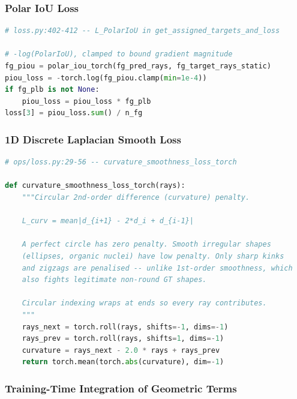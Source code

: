\subsubsection{Polar IoU Loss}

\begin{lstlisting}[language=Python]
# loss.py:402-412 -- L_PolarIoU in get_assigned_targets_and_loss

# -log(PolarIoU), clamped to bound gradient magnitude
fg_piou = polar_iou_torch(fg_pred_rays, fg_target_rays_static)
piou_loss = -torch.log(fg_piou.clamp(min=1e-4))
if fg_plb is not None:
    piou_loss = piou_loss * fg_plb
loss[3] = piou_loss.sum() / n_fg
\end{lstlisting}

\subsubsection{1D Discrete Laplacian Smooth Loss}

\begin{lstlisting}[language=Python]
# ops/loss.py:29-56 -- curvature_smoothness_loss_torch

def curvature_smoothness_loss_torch(rays):
    """Circular 2nd-order difference (curvature) penalty.

    L_curv = mean|d_{i+1} - 2*d_i + d_{i-1}|

    A perfect circle has zero penalty. Smooth irregular shapes
    (ellipses, organic nuclei) have low penalty. Only sharp kinks
    and zigzags are penalised -- unlike 1st-order smoothness, which
    also fights legitimate non-round GT shapes.

    Circular indexing wraps at ends so every ray contributes.
    """
    rays_next = torch.roll(rays, shifts=-1, dims=-1)
    rays_prev = torch.roll(rays, shifts=1, dims=-1)
    curvature = rays_next - 2.0 * rays + rays_prev
    return torch.mean(torch.abs(curvature), dim=-1)
\end{lstlisting}

\subsubsection{Training-Time Integration of Geometric Terms}

